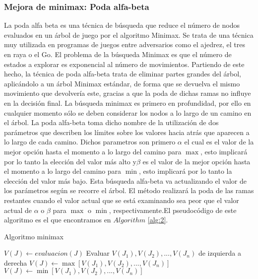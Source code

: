 \documentclass[runningheads]{llncs}
\begin{document}
\subsubsection{Mejora de minimax: Poda alfa-beta}
La poda alfa beta es una técnica de búsqueda que reduce el número de nodos evaluados en un árbol de juego por el algoritmo Minimax. Se trata de una técnica muy utilizada en programas de juegos entre adversarios como el ajedrez, el tres en raya o el Go.
El problema de la búsqueda Minimax es que el número de estados a explorar es exponencial al número de movimientos. Partiendo de este hecho, la técnica de poda alfa-beta trata de eliminar partes grandes del árbol, aplicándolo a un árbol Minimax estándar, de forma que se devuelva el mismo movimiento que devolvería este, gracias a que la poda de dichas ramas no influye en la decisión final.
La búsqueda minimax es primero en profundidad, por ello en cualquier momento sólo se deben considerar los nodos a lo largo de un camino en el árbol.
La poda alfa-beta toma dicho nombre de la utilización de dos parámetros que describen los límites sobre los valores hacia atrás que aparecen a lo largo de cada camino. Dichos parametros son primero $\alpha$ el cual es el valor de la mejor opción hasta el momento a lo largo del camino para $\max$, esto implicará por lo tanto la elección del valor más alto y$\beta$ es el valor de la mejor opción hasta el momento a lo largo del camino para $\min$, esto implicará por lo tanto la elección del valor más bajo.
Esta búsqueda alfa-beta va actualizando el valor de los parámetros según se recorre el árbol. El método realizará la poda de las ramas restantes cuando el valor actual que se está examinando sea peor que el valor actual de $\alpha$ o $\beta$ para $\max$ o $\min$, respectivamente.El pseudocódigo de este algoritmo es el que encontramos en $Algorithm$ \ref{alg:2}.
\begin{algorithm}[H]
\caption{Algoritmo minimax}\label{alg:1}
\begin{algorithmic}
    \State $V(J)\gets evaluacion(J)$
    \State Evaluar $V(J_1),V(J_2),...,V(J_n)$ de izquierda a derecha
        \State $V(J) \gets \max[V(J_1),V(J_2),...,V(J_n)]$
    \EndIf
        \State $V(J) \gets \min[V(J_1),V(J_2),...,V(J_n)]$
\EndIf
\end{algorithmic}
\end{algorithm}
\end{document}
